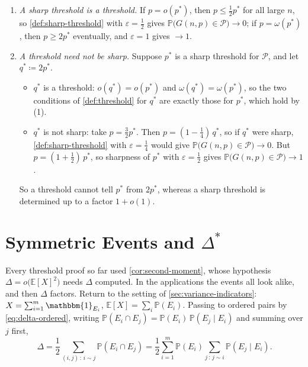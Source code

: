 \begin{remark}\label{rmk:sharp-vs-threshold}\hfill
    \begin{enumerate}[(1)]
        \item \emph{A sharp threshold is a threshold.} If \(p = o(p^{*})\), then \(p \le \frac{1}{2}p^{*}\) for all large \(n\), so \autoref{def:sharp-threshold} with \(\varepsilon = \frac{1}{2}\) gives \(\mathbb{P}\bigl( G(n,p) \in \mathcal{P} \bigr) \to 0\); if \(p = \omega(p^{*})\), then \(p \ge 2p^{*}\) eventually, and \(\varepsilon = 1\) gives \(\to 1\).
        \item \emph{A threshold need not be sharp.} Suppose \(p^{*}\) is a sharp threshold for \(\mathcal{P}\), and let \(q^{*} \coloneqq 2p^{*}\).
        \begin{itemize}
            \item \(q^{*}\) is a threshold: \(o(q^{*}) = o(p^{*})\) and \(\omega(q^{*}) = \omega(p^{*})\), so the two conditions of \autoref{def:threshold} for \(q^{*}\) are exactly those for \(p^{*}\), which hold by (1).
            \item \(q^{*}\) is not sharp: take \(p = \frac{3}{2}p^{*}\). Then \(p = (1 - \frac{1}{4})\,q^{*}\), so if \(q^{*}\) were sharp, \autoref{def:sharp-threshold} with \(\varepsilon = \frac{1}{4}\) would give \(\mathbb{P}\bigl( G(n,p) \in \mathcal{P} \bigr) \to 0\). But \(p = (1 + \frac{1}{2})\,p^{*}\), so sharpness of \(p^{*}\) with \(\varepsilon = \frac{1}{2}\) gives \(\mathbb{P}\bigl( G(n,p) \in \mathcal{P} \bigr) \to 1\).
        \end{itemize}
        So a threshold cannot tell \(p^{*}\) from \(2p^{*}\), whereas a sharp threshold is determined up to a factor \(1 + o(1)\).
    \end{enumerate}
\end{remark}

\section{Symmetric Events and \texorpdfstring{\(\Delta^{*}\)}{Delta*}}\label{sec:delta-star}

Every threshold proof so far used \autoref{cor:second-moment}, whose hypothesis \(\Delta = o\bigl( \mathbb{E}[X]^{2} \bigr)\) needs \(\Delta\) computed. In the applications the events all look alike, and then \(\Delta\) factors. Return to the setting of \autoref{sec:variance-indicators}: \(X = \sum_{i=1}^{m} \mathbbm{1}_{E_i}\), \(\mathbb{E}[X] = \sum_i \mathbb{P}(E_i)\). Passing to ordered pairs by \eqref{eq:delta-ordered}, writing \(\mathbb{P}(E_i \cap E_j) = \mathbb{P}(E_i)\,\mathbb{P}(E_j \mid E_i)\) and summing over \(j\) first,
\begin{equation}\label{eq:delta-factor}
    \Delta
    = \frac{1}{2} \sum_{(i,j) \,:\, i \sim j} \mathbb{P}(E_i \cap E_j)
    = \frac{1}{2} \sum_{i=1}^{m} \mathbb{P}(E_i) \sum_{j \,:\, j \sim i} \mathbb{P}(E_j \mid E_i).
\end{equation}

